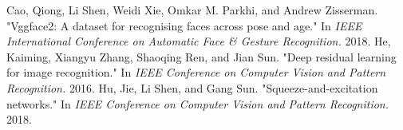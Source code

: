 \begin{thebibliography}{widest entry}
  Cao, Qiong, Li Shen, Weidi Xie, Omkar M. Parkhi, and Andrew Zisserman. "Vggface2: A dataset for recognising faces across pose and age." In \textit{IEEE International Conference on Automatic Face \& Gesture Recognition.} 2018.
   He, Kaiming, Xiangyu Zhang, Shaoqing Ren, and Jian Sun. "Deep residual learning for image recognition." In \textit{IEEE Conference on Computer Vision and Pattern Recognition.} 2016.
  Hu, Jie, Li Shen, and Gang Sun. "Squeeze-and-excitation networks." In \textit{IEEE Conference on Computer Vision and Pattern Recognition.} 2018.
\end{thebibliography}